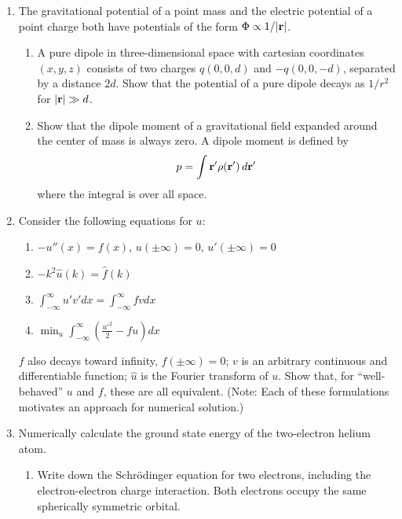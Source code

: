 \documentclass{article}
\begin{document}
\begin{enumerate}

\item \label{prbl:dipolezero}
The gravitational potential of a point mass and the electric potential of a point charge both have potentials of the form $\Phi \propto 1/|{\bf r}|$.
  \begin{enumerate}
  \item
    A pure dipole in three-dimensional space with cartesian coordinates $(x,y,z)$ consists of two charges $q(0,0,d)$ and $-q(0,0,-d)$, separated by a distance $2d$.
    Show that the potential of a pure dipole decays as $1/r^2$ for ${\bf |r|}\gg d$. 
  \item Show that the dipole moment of a gravitational field expanded around the center of mass is always zero.
%
A dipole moment is defined by
\[
p = \int {\bf r'} \rho({\bf r'}) \, d{\bf r'}
\]
where the integral is over all space.
  \end{enumerate}


\item Consider the following equations for $u$:
  \begin{enumerate}
    \item $-u''(x)=f(x)$, $u(\pm\infty)=0$, $u'(\pm\infty)=0$
    \item $-k^2 \hat u(k) = \hat f(k)$ 
    \item $\int_{-\infty}^\infty u' v' dx = \int_{-\infty}^\infty f v dx$ 
    \item $\min_u \int_{-\infty}^\infty \left(\frac{u'^2}{2} - f u \right) dx$ 
  \end{enumerate}
  $f$ also decays toward infinity, $f(\pm\infty)=0$; $v$ is an arbitrary continuous and differentiable function; $\hat u$ is the Fourier transform of $u$.   Show that, for ``well-behaved'' $u$ and $f$, these are all equivalent.   (Note: Each of these formulations motivates an approach for numerical solution.)

  

\item Numerically calculate the ground state energy of the two-electron helium atom.
\vspace{-1em}
\begin{enumerate}\setlength{\itemsep}{0pt}
\item Write down the Schr\"odinger equation for two electrons, including the electron-electron charge interaction.  Both electrons occupy the same spherically symmetric orbital.


\end{enumerate}
\end{enumerate}
\end{document}
